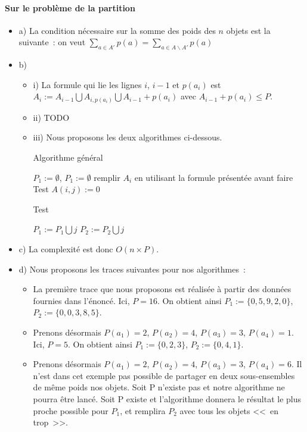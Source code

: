 \paragraph{Sur le problème de la partition}

\begin{itemize}
\item a) La condition nécessaire sur la somme des poids des $n$ objets
  est la suivante~: on veut $\sum_{a \in A'} p(a)= \sum_{a \in A
    \backslash A'}p(a)$
\item b) 
\begin{itemize}
\item i) La formule qui lie les lignes $i$, $i-1$ et $p(a_i)$ est $A_i
  := A_{i-1} \bigcup A_{i, p(a_i)} \bigcup A_{i-1}+p(a_i)$ avec
  $A_{i-1}+p(a_i) \leq P$.
\item ii) TODO
\item iii) Nous proposons les deux algorithmes ci-dessous.
\begin{algorithm}[t]
\caption{Algorithme général}
\label{algoexo7}
\begin{algorithmic}[1]
\STATE $P_1 := \emptyset $,  $P_1 := \emptyset $
\STATE remplir $A_i$ en utilisant la formule présentée avant
\STATE faire Test
\STATE $A(i,j):=0$
\ENDIF
\ENDWHILE
\ENDFOR
\end{algorithmic}
\end{algorithm}

\begin{algorithm}[t]
\caption{Test}
\label{algoexo7test}
\begin{algorithmic}[1]
\STATE $P_1 := P_1 \bigcup j$
\ELSE
\STATE $P_2 := P_2 \bigcup j$
\ENDIF
\ENDFOR
\end{algorithmic}
\end{algorithm}
\end{itemize}

\item c) La complexité est donc $O(n\times P)$.
\item d) Nous proposons les traces suivantes pour nos algorithmes~:
\begin{itemize}
\item La première trace que nous proposons est réalisée à partir des
  données fournies dans l'énoncé. Ici, $P=16$. On obtient ainsi $P_1 := \{ 0, 5, 9,
  2, 0\}$, $P_2 := \{ 0, 0, 3, 8, 5\}$.
\item Prenons désormais $P(a_1)=2$, $P(a_2)=4$, $P(a_3)=3$,
  $P(a_4)=1$. Ici, $P=5$. On obtient ainsi  $P_1 := \{ 0, 2, 3\}$,
  $P_2 := \{ 0, 4, 1\}$.
\item Prenons désormais $P(a_1)=2$, $P(a_2)=4$, $P(a_3)=3$,
  $P(a_4)=6$. Il n'est dans cet exemple pas possible de partager en
  deux sous-ensembles de même poids nos objets. Soit P n'existe pas et
  notre algorithme ne pourra être lancé. Soit P existe et l'algorithme
  donnera le résultat le plus proche possible pour $P_1$, et remplira
  $P_2$ avec tous les objets <<~en trop~>>.
\end{itemize}
\end{itemize}

